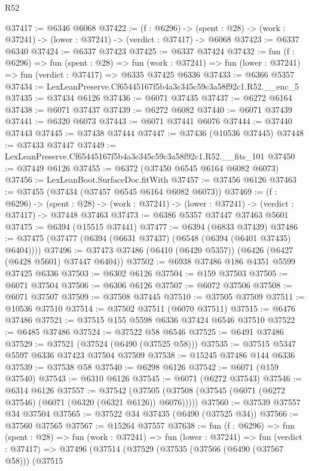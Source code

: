\begin{lexlean}{R52}
\begin{coremodule}
@37417 := @6346 @6068
@37422 := (f : @6296) ->
  (spent : @28) -> (work : @37241) -> (lower : @37241) -> (verdict : @37417) -> @6068
@37423 := @6337 @6340
@37424 := @6337 @37423
@37425 := @6337 @37424
@37432 := fun (f : @6296) =>
  fun (spent : @28) =>
  fun (work : @37241) => fun (lower : @37241) => fun (verdict : @37417) => @6335 @37425 @6336
@37433 := @6366 @5357
@37434 := LexLeanPreserve.Cf65445167f5b4a3c345c59c3a58f92c1.R52.__enc_5
@37435 := @37434 @6126
@37436 := @6071 @37435
@37437 := @6272 @6164
@37438 := @6071 @37437
@37439 := @6272 @6082
@37440 := @6071 @37439
@37441 := @6320 @6073
@37443 := @6071 @37441 @6076
@37444 := @37440 @37443
@37445 := @37438 @37444
@37447 := @37436 (@10536 @37445)
@37448 := @37433 @37447
@37449 := LexLeanPreserve.Cf65445167f5b4a3c345c59c3a58f92c1.R52.__fits_101
@37450 := @37449 @6126
@37455 := @6372 (@37450 @6545 @6164 @6082 @6073)
@37456 := LexLeanBoot.SurfaceDoc.fitWith
@37457 := @37456 @6126
@37463 := @37455 (@37434 (@37457 @6545 @6164 @6082 @6073))
@37469 := (f : @6296) ->
  (spent : @28) -> (work : @37241) -> (lower : @37241) -> (verdict : @37417) -> @37448 @37463
@37473 := @6386 @5357 @37447 @37463 @5601
@37475 := @6394 (@15515 @37441)
@37477 := @6394 (@6833 @37439)
@37486 := @37475 (@37477 (@6394 (@6631 @37437) (@6548 (@6394 (@6401 @37435) @6404))))
@37496 := @37473 @37486 (@6410 (@6420 @5357)) (@6426 (@6427 (@6428 @5601) @37447 @6404))
@37502 := @6938 @37486 @186 @4351 @5599 @37425 @6336
@37503 := @6302 @6126
@37504 := @159 @37503
@37505 := @6071 @37504
@37506 := @6306 @6126
@37507 := @6072 @37506
@37508 := @6071 @37507
@37509 := @37508 @37445
@37510 := @37505 @37509
@37511 := @10536 @37510
@37514 := @37502 @37511 (@6070 @37511)
@37515 := @6476 @37486
@37521 := @37515 @155 @5598 @6336 @37424 @6546 @37510
@37522 := @6485 @37486
@37524 := @37522 @58 @6546
@37525 := @6491 @37486
@37529 := @37521 (@37524 (@6490 (@37525 @58)))
@37535 := @37515 @5347 @5597 @6336 @37423 @37504 @37509
@37538 := @15245 @37486 @144 @6336
@37539 := @37538 @58
@37540 := @6298 @6126
@37542 := @6071 (@159 @37540)
@37543 := @6310 @6126
@37545 := @6071 (@6272 @37543)
@37546 := @6314 @6126
@37557 := @37542
    (@37505 (@37508 (@37545 (@6071 (@6272 @37546) (@6071 (@6320 (@6321 @6126)) @6076)))))
@37560 := @37539 @37557 @34 @37504
@37565 := @37522 @34 @37435 (@6490 (@37525 @34))
@37566 := @37560 @37565
@37567 := @15264 @37557
@37638 := fun (f : @6296) =>
  fun (spent : @28) =>
  fun (work : @37241) =>
  fun (lower : @37241) =>
  fun (verdict : @37417) =>
  @37496
    (@37514
      (@37529
        (@37535
          (@37566 (@6490 (@37567 @58)))
          (@37515

\end{coremodule}
\end{lexlean}
